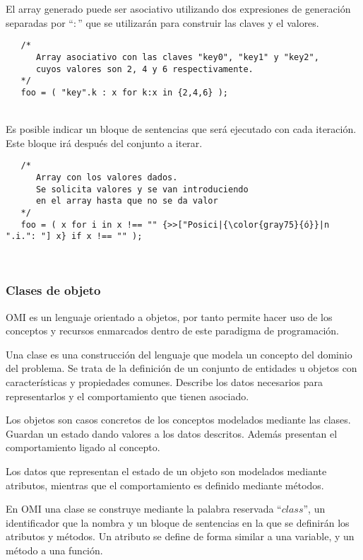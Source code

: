 El array generado puede ser asociativo utilizando dos expresiones de generación separadas por 
``$:$'' que se utilizarán para construir las claves y el valores. \\

\begin{lstlisting}
   /*
      Array asociativo con las claves "key0", "key1" y "key2",
      cuyos valores son 2, 4 y 6 respectivamente.
   */
   foo = ( "key".k : x for k:x in {2,4,6} );
\end{lstlisting}
\hfill\\ 

Es posible indicar un bloque de sentencias que será ejecutado 
con cada iteración. Este bloque irá después del conjunto a iterar. \\

\begin{lstlisting}
   /*
      Array con los valores dados.
      Se solicita valores y se van introduciendo
      en el array hasta que no se da valor 
   */
   foo = ( x for i in x !== "" {>>["Posici|{\color{gray75}{ó}}|n ".i.": "] x} if x !== "" );
\end{lstlisting}
\hfill\\ 

\subsubsection{Clases de objeto} \label{sec:class}
OMI es un lenguaje orientado a objetos, por tanto permite hacer uso de los conceptos y recursos enmarcados
dentro de este paradigma de programación.

Una clase es una construcción del lenguaje que modela un concepto del dominio del problema. Se trata de la definición de un conjunto de entidades u objetos
con características y propiedades comunes. Describe los datos necesarios para representarlos y el comportamiento que tienen asociado.

Los objetos son casos concretos de los conceptos modelados mediante las clases. Guardan un estado dando valores a los datos descritos.
Además presentan el comportamiento ligado al concepto. 

Los datos que representan el estado de un objeto son modelados mediante atributos, mientras que el comportamiento es definido mediante métodos.

En OMI una clase se construye mediante la palabra reservada ``$class$'', un identificador que la nombra y un bloque de sentencias en la que se 
definirán los atributos y métodos. Un atributo se define de forma similar a una variable, y un método a una función. \\

